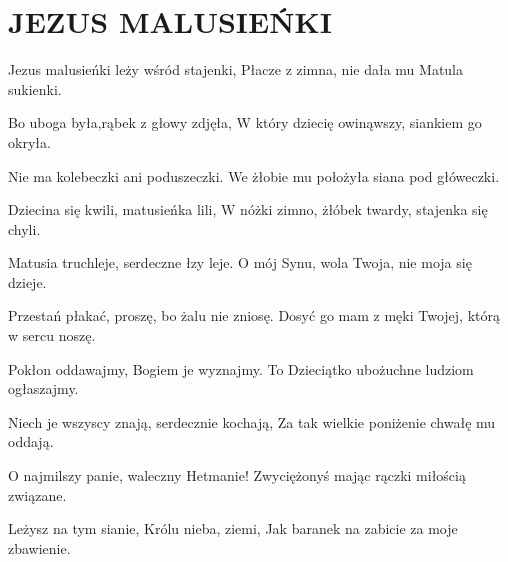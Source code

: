 \documentclass[../../../songbook.tex]{subfiles}
\begin{document}
\TabPositions{8cm} %
\section*{JEZUS MALUSIEŃKI}
{}
\vspace{0.5cm}
Jezus malusieńki leży wśród stajenki, 			  \newline
Płacze z zimna, nie dała mu Matula sukienki. 	   \newline

Bo uboga była,rąbek z głowy zdjęła, 		 \newline
W który dziecię owinąwszy, siankiem go okryła.  		 \newline

Nie ma kolebeczki ani poduszeczki. 		 \newline
We żłobie mu położyła siana pod główeczki.  		 \newline

Dziecina się kwili, matusieńka lili, 		 \newline
W nóżki zimno, żłóbek twardy, stajenka się chyli.  		 \newline

Matusia truchleje, serdeczne łzy leje.		 \newline
O mój Synu, wola Twoja, nie moja się dzieje. 		 \newline

Przestań płakać, proszę, bo żalu nie zniosę. 		 \newline
Dosyć go mam z męki Twojej, którą w sercu noszę.  		 \newline

Pokłon oddawajmy, Bogiem je wyznajmy. 		 \newline
To Dzieciątko ubożuchne ludziom ogłaszajmy.  		 \newline

Niech je wszyscy znają, serdecznie kochają, 		 \newline
Za tak wielkie poniżenie chwałę mu oddają.  		 \newline

O najmilszy panie, waleczny Hetmanie! 		 \newline
Zwyciężonyś mając rączki miłością związane.  		 \newline

Leżysz na tym sianie, Królu nieba, ziemi, 		 \newline
Jak baranek na zabicie za moje zbawienie. 		 \newline
\end{document}
